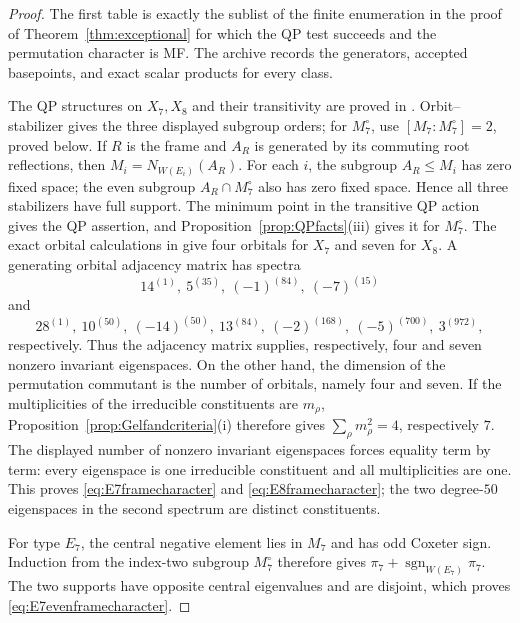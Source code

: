 \documentclass[11pt]{article}
\numberwithin{equation}{section}
\theoremstyle{definition}
\DeclareMathOperator{\sgn}{sgn}
\begin{document}
\begin{proof}
The first table is exactly the sublist of the finite enumeration in
the proof of Theorem~\ref{thm:exceptional} for which the QP test
succeeds and the permutation character is MF.  The archive records
the generators, accepted basepoints, and exact scalar products for
every class.

The QP structures on \(X_7,X_8\) and their transitivity are proved in
\cite{GXroots}.  Orbit--stabilizer gives the three displayed subgroup
orders; for \(M_7^\circ\), use \([M_7:M_7^\circ]=2\), proved below.
If \(R\) is the frame and \(A_R\) is generated by its commuting root
reflections, then \(M_i=N_{W(E_i)}(A_R)\).  For each \(i\), the subgroup
\(A_R\leq M_i\) has zero fixed space; the even subgroup
\(A_R\cap M_7^\circ\) also has zero fixed space.  Hence all three
stabilizers have full support.  The minimum point in the transitive QP action gives the
QP assertion, and Proposition~\ref{prop:QPfacts}(iii) gives it for
\(M_7^\circ\).
The exact orbital calculations in \cite{ZhangData} give four orbitals
for \(X_7\) and seven for \(X_8\).  A generating orbital adjacency
matrix has spectra
\[
 14^{(1)},\ 5^{(35)},\ (-1)^{(84)},\ (-7)^{(15)}
\]
and
\[
 28^{(1)},\ 10^{(50)},\ (-14)^{(50)},\ 13^{(84)},\
 (-2)^{(168)},\ (-5)^{(700)},\ 3^{(972)},
\]
respectively.  Thus the adjacency matrix supplies, respectively, four
and seven nonzero invariant eigenspaces.  On the other hand, the
dimension of the permutation commutant is the number of orbitals,
namely four and seven.  If the multiplicities of the irreducible
constituents are \(m_\rho\), Proposition~\ref{prop:Gelfandcriteria}(i)
therefore gives
\(\sum_\rho m_\rho^2=4\), respectively \(7\).  The displayed number of
nonzero invariant eigenspaces forces equality term by term: every
eigenspace is one irreducible constituent and all multiplicities are
one.  This proves \eqref{eq:E7framecharacter} and
\eqref{eq:E8framecharacter}; the two degree-\(50\) eigenspaces in the
second spectrum are distinct constituents.

For type \(E_7\), the central negative element lies in \(M_7\) and has
odd Coxeter sign.  Induction from the index-two subgroup
\(M_7^\circ\) therefore gives \(\pi_7+\sgn_{W(E_7)}\pi_7\).
The two supports have opposite central eigenvalues and are disjoint,
which proves \eqref{eq:E7evenframecharacter}.
\end{proof}
\end{document}
